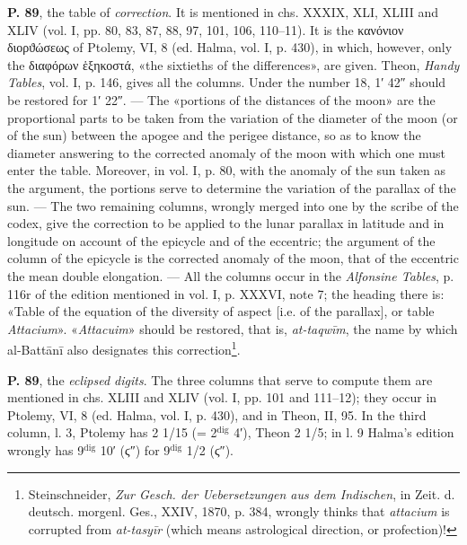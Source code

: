 \documentclass[11pt]{article}
\begin{document}
\par \textbf{P. 89}, the table of \emph{correction}. It is mentioned in chs. XXXIX, XLI, XLIII and XLIV (vol. I, pp. 80, 83, 87, 88, 97, 101, 106, 110–11). It is the {\greekfont κανόνιον διορϑώσεως} of Ptolemy, VI, 8 (ed. Halma, vol. I, p. 430), in which, however, only the {\greekfont διαφόρων ἑξηκοστά}, «the sixtieths of the differences», are given. Theon, \emph{Handy Tables}, vol. I, p. 146, gives all the columns. Under the number 18, 1′ 42″ should be restored for 1′ 22″. — The «portions of the distances of the moon» are the proportional parts to be taken from the variation of the diameter of the moon (or of the sun) between the apogee and the perigee distance, so as to know the diameter answering to the corrected anomaly of the moon with which one must enter the table. Moreover, in vol. I, p. 80, with the anomaly of the sun taken as the argument, the portions serve to determine the variation of the parallax of the sun. — The two remaining columns, wrongly merged into one by the scribe of the codex, give the correction to be applied to the lunar parallax in latitude and in longitude on account of the epicycle and of the eccentric; the argument of the column of the epicycle is the corrected anomaly of the moon, that of the eccentric the mean double elongation. — All the columns occur in the \emph{Alfonsine Tables}, p. 116r of the edition mentioned in vol. I, p. XXXVI, note 7; the heading there is: «Table of the equation of the diversity of aspect [i.e. of the parallax], or table \emph{Attacium}». «\emph{Attacuim}» should be restored, that is, \emph{at-taqwīm}, the name by which al-Battānī also designates this correction\footnote{Steinschneider, \emph{Zur Gesch. der Uebersetzungen aus dem Indischen}, in Zeit. d. deutsch. morgenl. Ges., XXIV, 1870, p. 384, wrongly thinks that \emph{attacium} is corrupted from \emph{at-tasyīr} (which means astrological direction, or profection)!}.\par
\par \textbf{P. 89}, the \emph{eclipsed digits}. The three columns that serve to compute them are mentioned in chs. XLIII and XLIV (vol. I, pp. 101 and 111–12); they occur in Ptolemy, VI, 8 (ed. Halma, vol. I, p. 430), and in Theon, II, 95. In the third column, l. 3, Ptolemy has 2 1/15 (= 2$^{\mathrm{dig}}$ 4′), Theon 2 1/5; in l. 9 Halma's edition wrongly has 9$^{\mathrm{dig}}$ 10′ ({\greekfont ϛ}″) for 9$^{\mathrm{dig}}$ 1/2 ({\greekfont ϛ}″).\par
\end{document}
